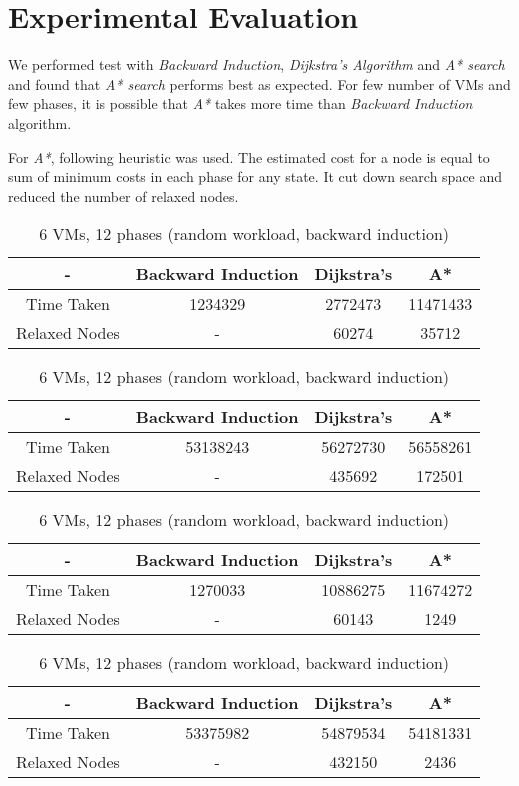 \documentclass[a4paper,12pt]{article}
\begin{document}
\section{Experimental Evaluation}
We performed test with \textit{Backward Induction}, \textit{Dijkstra's Algorithm} and \textit{A* search} and found that \textit{A* search} performs best as expected. For few number of VMs and few phases, it is possible that \textit{A*} takes more time than \textit{Backward Induction} algorithm.

For \textit{A*}, following heuristic was used. The estimated cost for a node is equal to sum of minimum costs in each phase for any state. It cut down search space and reduced the number of relaxed nodes.

\begin{table}[h]
\centering
\begin{tabular}{|c|c|c|c|}
\hline 
- & Backward Induction & Dijkstra's & A* \\ 
\hline 
Time Taken & 1234329 & 2772473 & 11471433 \\ 
\hline 
Relaxed Nodes & - & 60274 & 35712 \\ 
\hline 
\end{tabular}
\caption{5 VMs, 24 phases (random workload)}
\vspace{0.6cm}

\begin{tabular}{|c|c|c|c|}
\hline 
- & Backward Induction & Dijkstra's & A* \\ 
\hline 
Time Taken & 53138243 & 56272730 & 56558261 \\ 
\hline 
Relaxed Nodes & - & 435692 & 172501 \\ 
\hline 
\end{tabular} 
\caption{6 VMs, 12 phases (random workload)}
\vspace{0.6cm}

\begin{tabular}{|c|c|c|c|}
\hline 
- & Backward Induction & Dijkstra's & A* \\ 
\hline 
Time Taken & 1270033 & 10886275 & 11674272 \\ 
\hline 
Relaxed Nodes & - & 60143 & 1249 \\ 
\hline 
\end{tabular}
\caption{5 VMs, 24 phases (random workload, backward induction)}
\vspace{0.6cm}

\begin{tabular}{|c|c|c|c|}
\hline 
- & Backward Induction & Dijkstra's & A* \\ 
\hline 
Time Taken & 53375982 & 54879534 & 54181331 \\ 
\hline 
Relaxed Nodes & - & 432150 & 2436 \\ 
\hline 
\end{tabular}
\caption{6 VMs, 12 phases (random workload, backward induction)}
\end{table}
\vspace*{-0.5cm}
\end{document}
